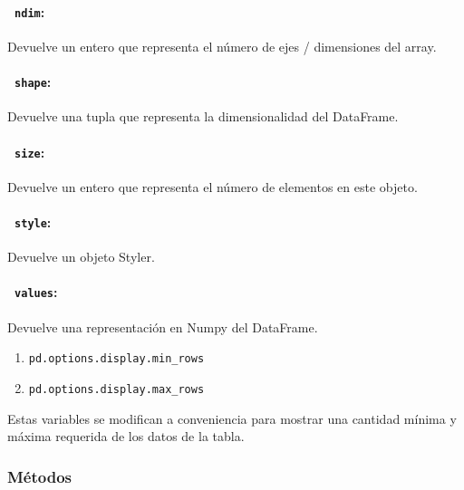 \paragraph{~\hspace{2em}\texttt{ndim}:} Devuelve un entero que representa el número de ejes / dimensiones del array.
\paragraph{~\hspace{2em}\texttt{shape}:} Devuelve una tupla que representa la dimensionalidad del DataFrame.
\paragraph{~\hspace{2em}\texttt{size}:} Devuelve un entero que representa el número de elementos en este objeto.
\paragraph{~\hspace{2em}\texttt{style}:} Devuelve un objeto Styler.
\paragraph{~\hspace{2em}\texttt{values}:} Devuelve una representación en Numpy del DataFrame.
\begin{enumerate}
\item\texttt{pd.options.display.min\_rows}
\item\texttt{pd.options.display.max\_rows}
\end{enumerate}
Estas variables se modifican a conveniencia para mostrar una cantidad mínima y máxima requerida de los datos de la tabla.
\subsubsection{Métodos}

